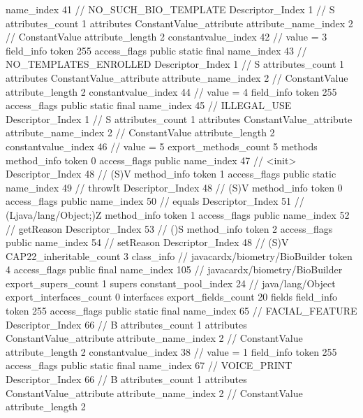 {{{{{				name_index	41		// NO_SUCH_BIO_TEMPLATE
				Descriptor_Index	1		// S
				attributes_count	1
				attributes {
				ConstantValue_attribute {
					attribute_name_index	2		// ConstantValue
					attribute_length	2
					constantvalue_index	42		// value = 3
				}
				}
			}
			field_info {
				token	255
				access_flags	public static final
				name_index	43		// NO_TEMPLATES_ENROLLED
				Descriptor_Index	1		// S
				attributes_count	1
				attributes {
				ConstantValue_attribute {
					attribute_name_index	2		// ConstantValue
					attribute_length	2
					constantvalue_index	44		// value = 4
				}
				}
			}
			field_info {
				token	255
				access_flags	public static final
				name_index	45		// ILLEGAL_USE
				Descriptor_Index	1		// S
				attributes_count	1
				attributes {
				ConstantValue_attribute {
					attribute_name_index	2		// ConstantValue
					attribute_length	2
					constantvalue_index	46		// value = 5
				}
				}
			}
			}
			export_methods_count	5
			methods {
				method_info {
					token	0
					access_flags	public
					name_index	47		// <init>
					Descriptor_Index	48		// (S)V
				}
				method_info {
					token	1
					access_flags	public static
					name_index	49		// throwIt
					Descriptor_Index	48		// (S)V
				}
				method_info {
					token	0
					access_flags	public
					name_index	50		// equals
					Descriptor_Index	51		// (Ljava/lang/Object;)Z
				}
				method_info {
					token	1
					access_flags	public
					name_index	52		// getReason
					Descriptor_Index	53		// ()S
				}
				method_info {
					token	2
					access_flags	public
					name_index	54		// setReason
					Descriptor_Index	48		// (S)V
				}
			}
			CAP22_inheritable_count	3
		}
		class_info {		// javacardx/biometry/BioBuilder
			token	4
			access_flags	public final
			name_index	105		// javacardx/biometry/BioBuilder
			export_supers_count	1
			supers {
				constant_pool_index	24		// java/lang/Object
			}
			export_interfaces_count	0
			interfaces {
			}
			export_fields_count	20
			fields {
			field_info {
				token	255
				access_flags	public static final
				name_index	65		// FACIAL_FEATURE
				Descriptor_Index	66		// B
				attributes_count	1
				attributes {
				ConstantValue_attribute {
					attribute_name_index	2		// ConstantValue
					attribute_length	2
					constantvalue_index	38		// value = 1
				}
				}
			}
			field_info {
				token	255
				access_flags	public static final
				name_index	67		// VOICE_PRINT
				Descriptor_Index	66		// B
				attributes_count	1
				attributes {
				ConstantValue_attribute {
					attribute_name_index	2		// ConstantValue
					attribute_length	2
}}}}}}}
